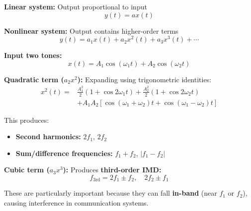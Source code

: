 \textbf{Linear system:} Output proportional to input
\begin{equation}
\label{eq:linear-system}
y(t) = a x(t)
\end{equation}

\textbf{Nonlinear system:} Output contains higher-order terms
\begin{equation}
\label{eq:nonlinear-system}
y(t) = a_1 x(t) + a_2 x^2(t) + a_3 x^3(t) + \cdots
\end{equation}

\textbf{Input two tones:}
\begin{equation}
\label{eq:two-tone-input}
x(t) = A_1 \cos(\omega_1 t) + A_2 \cos(\omega_2 t)
\end{equation}

\textbf{Quadratic term ($a_2 x^2$):} Expanding using trigonometric identities:
\begin{equation}
\label{eq:quadratic-expansion}
\begin{split}
x^2(t) = & \frac{A_1^2}{2} (1 + \cos 2\omega_1 t) + \frac{A_2^2}{2} (1 + \cos 2\omega_2 t) \\
& + A_1 A_2 [\cos(\omega_1 + \omega_2)t + \cos(\omega_1 - \omega_2)t]
\end{split}
\end{equation}

This produces:
\begin{itemize}
\item \textbf{Second harmonics:} $2f_1$, $2f_2$
\item \textbf{Sum/difference frequencies:} $f_1 + f_2$, $|f_1 - f_2|$
\end{itemize}

\textbf{Cubic term ($a_3 x^3$):} Produces \textbf{third-order IMD:}
\begin{equation}
\label{eq:third-order-imd}
f_{3\text{rd}} = 2f_1 \pm f_2, \quad 2f_2 \pm f_1
\end{equation}

These are particularly important because they can fall \textbf{in-band} (near $f_1$ or $f_2$), causing interference in communication systems.


